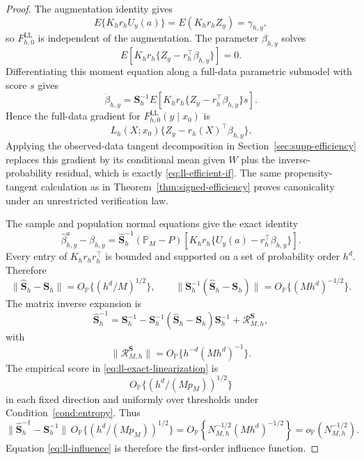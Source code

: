 \begin{proof}
The augmentation identity gives
\[
E\{K_hr_hU_y(a)\}=E(K_hr_hZ_y)=\gamma_{h,y},
\]
so \(F_{h,0}^{\mathrm{LL}}\) is independent of the augmentation. The parameter \(\beta_{h,y}\) solves
\[
E[K_hr_h\{Z_y-r_h^\top\beta_{h,y}\}]=0.
\]
Differentiating this moment equation along a full-data parametric submodel with score \(s\) gives
\[
\dot\beta_{h,y}
=
\mathbf S_h^{-1}
E[K_hr_h\{Z_y-r_h^\top\beta_{h,y}\}s].
\]
Hence the full-data gradient for \(F_{h,0}^{\mathrm{LL}}(y\mid x_0)\) is
\[
L_h(X;x_0)\{Z_y-r_h(X)^\top\beta_{h,y}\}.
\]
Applying the observed-data tangent decomposition in Section~\ref{sec:supp-efficiency} replaces this gradient by its conditional mean given \(W\) plus the inverse-probability residual, which is exactly \eqref{eq:ll-efficient-if}. The same propensity-tangent calculation as in Theorem~\ref{thm:signed-efficiency} proves canonicality under an unrestricted verification law.

The sample and population normal equations give the exact identity
\begin{equation}
\widehat\beta_{h,y}^{a}-\beta_{h,y}
=
\widehat{\mathbf S}_h^{-1}
(\mathbb P_M-P)
\left[K_hr_h\{U_y(a)-r_h^\top\beta_{h,y}\}\right].
\label{eq:ll-exact-linearization}
\end{equation}
Every entry of \(K_hr_hr_h^\top\) is bounded and supported on a set of probability order \(h^d\). Therefore
\begin{equation}
\|\widehat{\mathbf S}_h-\mathbf S_h\|
=O_{\mathbb P}\{(h^d/M)^{1/2}\},
\qquad
\|\mathbf S_h^{-1}(\widehat{\mathbf S}_h-\mathbf S_h)\|
=O_{\mathbb P}\{(Mh^d)^{-1/2}\}.
\label{eq:ll-gram-rate}
\end{equation}
The matrix inverse expansion is
\begin{equation}
\widehat{\mathbf S}_h^{-1}
=
\mathbf S_h^{-1}
-
\mathbf S_h^{-1}(\widehat{\mathbf S}_h-\mathbf S_h)\mathbf S_h^{-1}
+\mathcal R_{M,h}^{\mathbf S},
\label{eq:ll-inverse-expansion}
\end{equation}
with
\[
\|\mathcal R_{M,h}^{\mathbf S}\|
=O_{\mathbb P}\{h^{-d}(Mh^d)^{-1}\}.
\]
The empirical score in \eqref{eq:ll-exact-linearization} is
\[
O_{\mathbb P}\{(h^d/(Mp_M))^{1/2}\}
\]
in each fixed direction and uniformly over thresholds under Condition~\ref{cond:entropy}. Thus
\[
\|\widehat{\mathbf S}_h^{-1}-\mathbf S_h^{-1}\|
\,
O_{\mathbb P}\{(h^d/(Mp_M))^{1/2}\}
=
O_{\mathbb P}\left\{
N_{M,h}^{-1/2}(Mh^d)^{-1/2}
\right\}
=o_{\mathbb P}(N_{M,h}^{-1/2}).
\]
Equation \eqref{eq:ll-influence} is therefore the first-order influence function.


\end{proof}
